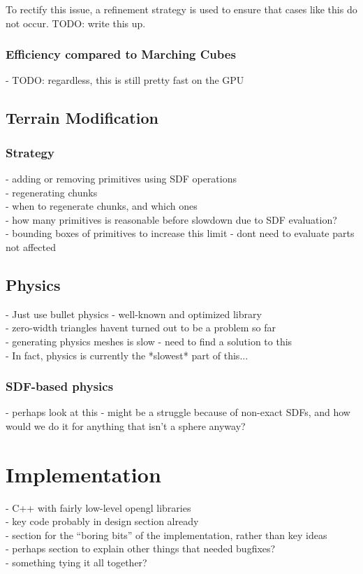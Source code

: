 \documentclass{article}
\begin{document}
To rectify this issue, a refinement strategy is used to ensure that cases like this do not occur. TODO: write this up.

\subsubsection{Efficiency compared to Marching Cubes}
- TODO: regardless, this is still pretty fast on the GPU\\

\subsection{Terrain Modification}
\subsubsection{Strategy}
 - adding or removing primitives using SDF operations\\
 - regenerating chunks\\
 - when to regenerate chunks, and which ones\\
 - how many primitives is reasonable before slowdown due to SDF evaluation?\\
 - bounding boxes of primitives to increase this limit - dont need to evaluate parts not affected\\
 
 \subsection{Physics}
 - Just use bullet physics - well-known and optimized library\\
 - zero-width triangles havent turned out to be a problem so far\\
 - generating physics meshes is slow - need to find a solution to this\\
 - In fact, physics is currently the *slowest* part of this...\\
 \subsubsection{SDF-based physics}
 - perhaps look at this - might be a struggle because of non-exact SDFs, and how would we do it for anything that isn't a sphere anyway?
 
 \section{Implementation}
  - C++ with fairly low-level opengl libraries\\
  - key code probably in design section already\\
  - section for the ``boring bits'' of the implementation, rather than key ideas\\
  - perhaps section to explain other things that needed bugfixes?\\
  - something tying it all together?
  
\end{document}
